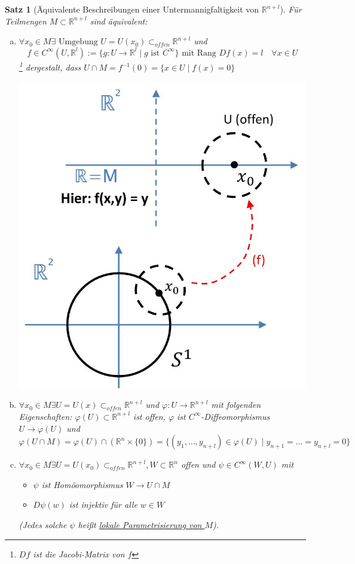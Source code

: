 \documentclass[a4paper,11pt,notitlepage]{report}
\newtheorem{theorem}{Satz}[chapter]
\theoremstyle{remark}
\theoremstyle{definition}
\newcommand{\R}{{\ensuremath{\mathbb{R}}}}
\begin{document}
\begin{theorem}[Äquivalente Beschreibungen einer Untermannigfaltigkeit von $\R^{n+l}$]
	Für Teilmengen $M \subset \R^{n+l}$ sind äquivalent:
	\begin{enumerate}[(a)]
		\item $\forall x_0 \in M \exists \text{ Umgebung } U = U(x_0) \subset_{offen} \R^{n+l}$ und $$f \in C^\infty(U, \R^l) := \{g \colon U \rightarrow \R^l \mid g \text{ ist } C^\infty\}\text{ mit Rang }Df(x) = l \quad \forall x \in U$$ \footnote{$Df$ ist die Jacobi-Matrix von $f$} dergestalt, dass $U \cap M = f^{-1}(0) = \{x \in U \mid f(x) = 0\}$ 
	\begin{center}
\includegraphics[scale=0.5]{images/Satz_UnterMf.jpg}
	\end{center}
		\item $\forall x_0 \in M \exists U = U(x) \subset_{offen} \R^{n+l}$ und $\varphi \colon U \rightarrow \R^{n+l}$ mit folgenden Eigenschaften:
		$\varphi(U) \subset \R^{n+l}$ ist offen, \newline $\varphi$ ist $C^\infty$-Diffeomorphismus $U \rightarrow \varphi(U)$ und $$\varphi(U \cap M) = \varphi(U) \cap (\R^n \times \{0\}) = \{(y_1, \ldots, y_{n+l}) \in \varphi(U) \mid y_{n+1} = \ldots = y_{n+l} = 0 \}$$
		\item $\forall x_0 \in M \exists U = U(x_0) \subset_{offen} \R^{n+l}, W \subset \R^n$ offen und $\psi \in C^\infty(W,U)$ mit 
			\begin{itemize}
				\item $\psi$ ist Homöomorphismus $W \rightarrow U \cap M$
				\item $D\psi(w)$ ist injektiv für alle $w \in W$
			\end{itemize}
			(Jedes solche $\psi$ heißt \underline{lokale Parametrisierung von $M$}).
	\end{enumerate}
\end{theorem}
\end{document}
